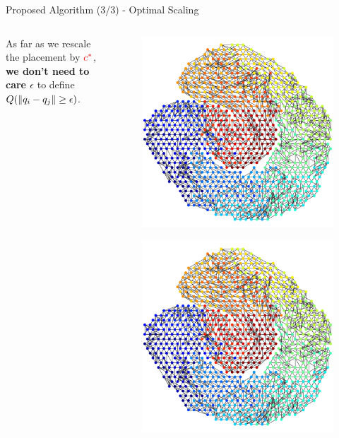 \documentclass[dvipdfmx,13pt,aspectratio=169]{beamer}
\newcommand{\red}[1]{\textcolor{red}{#1}}
\begin{document}
\begin{frame}{Proposed Algorithm (3/3) - Optimal Scaling}
\begin{columns}
\begin{column}{0.75\columnwidth}
      As far as we rescale the placement by $\red{c^*}$,\\
      \textbf{we don't need to care $\epsilon$} to define $Q (\norm{q_i - q_j} \geq \epsilon)$.
    \end{column}
    \begin{column}{0.25\columnwidth}
      \vspace{-0.5cm}
      \begin{figure}[t]
        \centering
        \includegraphics[width=0.2\columnwidth]{../main/individual/vis/fig1_init_CN.png}\\
        \includegraphics[width=0.8\columnwidth]{../main/individual/vis/fig1_init_CN.png}\\

\end{figure}
\end{column}
\end{columns}
\end{frame}
\end{document}
